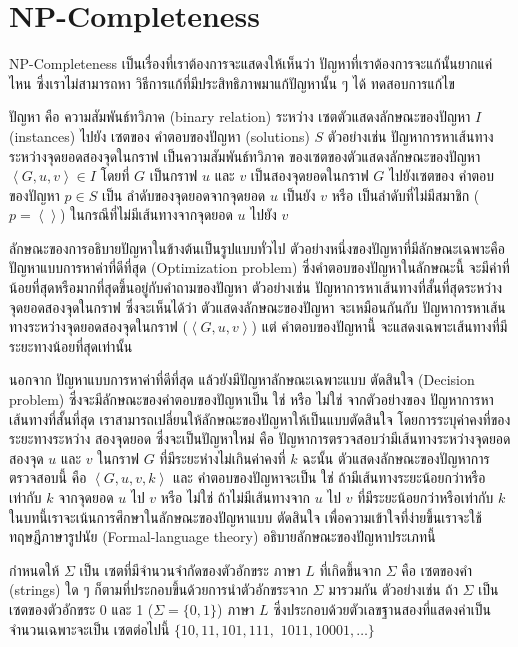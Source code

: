 \chapter{NP-Completeness}

\par{
NP-Completeness เป็นเรื่องที่เราต้องการจะแสดงให้เห็นว่า 
ปัญหาที่เราต้องการจะแก้นั้นยากแค่ไหน 
ซึ่งเราไม่สามารถหา วิธีการแก้ที่มีประสิทธิภาพมาแก้ปัญหานั้น ๆ ได้ 
ทดสอบการแก้ไข
}

\par{
ปัญหา คือ ความสัมพันธ์ทวิภาค (binary relation) ระหว่าง เซตตัวแสดงลักษณะของปัญหา $I$ (instances) ไปยัง เซตของ คำตอบของปัญหา (solutions) $S$ ตัวอย่างเช่น ปัญหาการหาเส้นทางระหว่างจุดยอดสองจุดในกราฟ เป็นความสัมพันธ์ทวิภาค ของเซตของตัวแสดงลักษณะของปัญหา $\left<G, u, v\right> \in I$ โดยที่ $G$ เป็นกราฟ $u$ และ $v$ เป็นสองจุดยอดในกราฟ $G$ ไปยังเซตของ คำตอบของปัญหา $p \in S$ เป็น ลำดับของจุดยอดจากจุดยอด $u$ เป็นยัง $v$ หรือ เป็นลำดับที่ไม่มีสมาชิก ($p = \left<\right>$) ในกรณีที่ไม่มีเส้นทางจากจุดยอด $u$ ไปยัง $v$ 
}

\par{
ลักษณะของการอธิบายปัญหาในข้างต้นเป็นรูปแบบทั่วไป ตัวอย่างหนึ่งของปัญหาที่มีลักษณะเฉพาะคือ ปัญหาแบบการหาค่าที่ดีที่สุด (Optimization problem) ซึ่งคำตอบของปัญหาในลักษณะนี้ จะมีค่าที่น้อยที่สุดหรือมากที่สุดขึ้นอยู่กับคำถามของปัญหา ตัวอย่างเช่น ปัญหาการหาเส้นทางที่สั้นที่สุดระหว่างจุดยอดสองจุดในกราฟ ซึ่งจะเห็นได้ว่า ตัวแสดงลักษณะของปัญหา จะเหมือนกันกับ ปัญหาการหาเส้นทางระหว่างจุดยอดสองจุดในกราฟ ($\left<G, u, v\right>$) แต่ คำตอบของปัญหานี้ จะแสดงเฉพาะเส้นทางที่มีระยะทางน้อยที่สุดเท่านั้น
}

\par{
นอกจาก ปัญหาแบบการหาค่าที่ดีที่สุด แล้วยังมีปัญหาลักษณะเฉพาะแบบ ตัดสินใจ (Decision problem) ซึ่งจะมีลักษณะของคำตอบของปัญหาเป็น ใช่ หรือ ไม่ใช่ จากตัวอย่างของ ปัญหาการหาเส้นทางที่สั้นที่สุด เราสามารถเปลี่ยนให้ลักษณะของปัญหาให้เป็นแบบตัดสินใจ โดยการระบุค่าคงที่ของ ระยะทางระหว่าง สองจุดยอด ซึ่งจะเป็นปัญหาใหม่ คือ ปัญหาการตรวจสอบว่ามีเส้นทางระหว่างจุดยอดสองจุด $u$ และ $v$ ในกราฟ $G$ ที่มีระยะห่างไม่เกินค่าคงที่ $k$ ฉะนั้น ตัวแสดงลักษณะของปัญหาการตรวจสอบนี้ คือ $\left<G, u, v, k\right>$ และ คำตอบของปัญหาจะเป็น ใช่ ถ้ามีเส้นทางระยะน้อยกว่าหรือเท่ากับ $k$ จากจุดยอด $u$ ไป $v$ หรือ ไม่ใช่ ถ้าไม่มีเส้นทางจาก $u$ ไป $v$ ที่มีระยะน้อยกว่าหรือเท่ากับ $k$ ในบทนี้เราจะเน้นการศึกษาในลักษณะของปัญหาแบบ ตัดสินใจ เพื่อความเข้าใจที่ง่ายขึ้นเราจะใช้ ทฤษฎีภาษารูปนัย (Formal-language theory) อธิบายลักษณะของปัญหาประเภทนี้ 
}

\par{
กำหนดให้ $\Sigma$ เป็น เซตที่มีจำนวนจำกัดของตัวอักขระ ภาษา $L$ ที่เกิดขึ้นจาก $\Sigma$ คือ เซตของคำ (strings) ใด ๆ ก็ตามที่ประกอบขึ้นด้วยการนำตัวอักขระจาก $\Sigma$ มารวมกัน ตัวอย่างเช่น ถ้า $\Sigma$ เป็น เซตของตัวอักขระ 0 และ 1 ($\Sigma = \{0, 1\}$) ภาษา $L$ ซึ่งประกอบด้วยตัวเลขฐานสองที่แสดงค่าเป็นจำนวนเฉพาะจะเป็น เซตต่อไปนี้ $\{10, 11, 101, 111,$ $1011, 10001, \ldots \}$
} 

